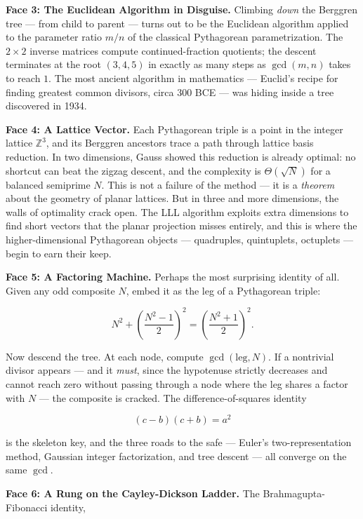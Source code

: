 \textbf{Face 3: The Euclidean Algorithm in Disguise.} Climbing \textit{down} the Berggren tree --- from child to parent --- turns out to be the Euclidean algorithm applied to the parameter ratio $m/n$ of the classical Pythagorean parametrization. The $2 \times 2$ inverse matrices compute continued-fraction quotients; the descent terminates at the root $(3, 4, 5)$ in exactly as many steps as $\gcd(m, n)$ takes to reach $1$. The most ancient algorithm in mathematics --- Euclid's recipe for finding greatest common divisors, circa 300 BCE --- was hiding inside a tree discovered in 1934.

\textbf{Face 4: A Lattice Vector.} Each Pythagorean triple is a point in the integer lattice $\mathbb{Z}^3$, and its Berggren ancestors trace a path through lattice basis reduction. In two dimensions, Gauss showed this reduction is already optimal: no shortcut can beat the zigzag descent, and the complexity is $\Theta(\sqrt{N})$ for a balanced semiprime $N$. This is not a failure of the method --- it is a \textit{theorem} about the geometry of planar lattices. But in three and more dimensions, the walls of optimality crack open. The LLL algorithm exploits extra dimensions to find short vectors that the planar projection misses entirely, and this is where the higher-dimensional Pythagorean objects --- quadruples, quintuplets, octuplets --- begin to earn their keep.

\textbf{Face 5: A Factoring Machine.} Perhaps the most surprising identity of all. Given any odd composite $N$, embed it as the leg of a Pythagorean triple:

\[
N^2 + \left(\frac{N^2 - 1}{2}\right)^{\!2} = \left(\frac{N^2 + 1}{2}\right)^{\!2}.\]

Now descend the tree. At each node, compute $\gcd(\text{leg}, N)$. If a nontrivial divisor appears --- and it \textit{must}, since the hypotenuse strictly decreases and cannot reach zero without passing through a node where the leg shares a factor with $N$ --- the composite is cracked. The difference-of-squares identity

\[
(c - b)(c + b) = a^2\]

is the skeleton key, and the three roads to the safe --- Euler's two-representation method, Gaussian integer factorization, and tree descent --- all converge on the same $\gcd$.

\textbf{Face 6: A Rung on the Cayley-Dickson Ladder.} The Brahmagupta-Fibonacci identity,

